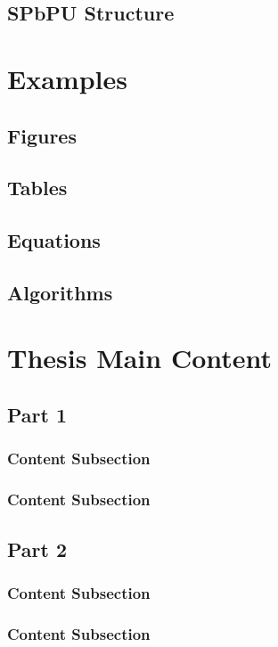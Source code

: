 \documentclass[a4paper,twoside,12pt]{book}
\begin{document}
			\section{SPbPU Structure} 
		\chapter{Examples} 
			\section{Figures} 
			\section{Tables} 
			\section{Equations}  \clearpage
			\section{Algorithms} 
		\chapter{Thesis Main Content} 
			\section{Part 1}
				\subsection{Content Subsection}
				\subsection{Content Subsection}
			\section{Part 2}
				\subsection{Content Subsection}
				\subsection{Content Subsection}
\end{document}
